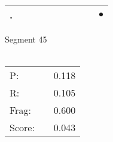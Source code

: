 \documentclass[landscape]{article}
\newcommand{\ssp}{\hspace{2pt}}
\newcommand{\mex}{\cellcolor{g}$\bullet$}
\begin{document}
\begin{tabular}{|l|p{10pt}|p{10pt}|p{10pt}|p{10pt}|p{10pt}|p{10pt}|p{10pt}|p{10pt}|p{10pt}|}
\hline
\ssp \cellcolor{ref8}. \ssp&\hspace{2pt}&\hspace{2pt}&\hspace{2pt}&\hspace{2pt}&\hspace{2pt}&\hspace{2pt}&\hspace{2pt}&\hspace{2pt}&\hspace{2pt}\mex\\
\hline
\end{tabular}

\vspace{6pt}
\noindent Segment 45\\\\
\noindent\begin{tabular}{lm{12pt}r}
\hline
P:&&0.118\\
R:&&0.105\\
Frag:&&0.600\\
Score:&&0.043\\
\end{tabular}

\newpage
\end{document}
